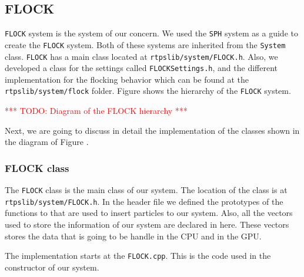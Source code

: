 \subsection{FLOCK}
\texttt{FLOCK} system is the system of our concern. We used the \texttt{SPH} system as a guide to create the \texttt{FLOCK} system. Both of these systems are inherited from the \texttt{System} class. \texttt{FLOCK} has a main class located at \texttt{rtpslib/system/FLOCK.h}. Also, we developed a class for the settings called \texttt{FLOCKSettings.h}, and the different implementation for the flocking behavior which can be found at the \texttt{rtpslib/system/flock} folder. Figure \label{flockdiagram} shows the hierarchy of the \texttt{FLOCK} system.

\textcolor{red}{*** TODO: Diagram of the FLOCK hierarchy ***}

Next, we are going to discuss in detail the implementation of the classes shown in the diagram of Figure \label{flockdiagram}.

\subsubsection{FLOCK class}
The \texttt{FLOCK} class is the main class of our system. The location of the class is at \texttt{rtpslib/system/FLOCK.h}. In the header file we defined the prototypes of the functions to that are used to insert particles to our system. Also, all the vectors used to store the information of our system are declared in here. These vectors stores the data that is going to be handle in the CPU and in the GPU.

The implementation starts at the \texttt{FLOCK.cpp}. This is the code used in the constructor of  our system.

